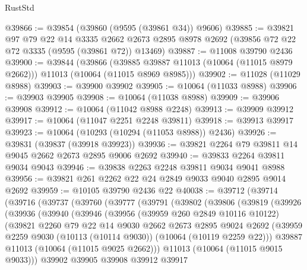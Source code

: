 \begin{lexlean}{RustStd}
\begin{coremodule}
@39866 := @39854 (@39860 (@9595 (@39861 @34)) @9606)
@39885 := @39821
    @97
    @79
    @22
    @14
    @3335
    @2662
    @2673
    @2895
    @8978
    @2692
    (@39856 @72 @22 @72 @3335 (@9595 (@39861 @72)) @13469)
@39887 := @11008 @39790 @2436
@39900 := @39844
    (@39866
      (@39885 @39887 @11013 (@10064 (@11015 @8979 @2662)))
      @11013
      (@10064 (@11015 @8969 @8985)))
@39902 := @11028 (@11029 @8988)
@39903 := @39900 @39902
@39905 := @10064 (@11033 @8988)
@39906 := @39903 @39905
@39908 := @10064 (@11038 @8988)
@39909 := @39906 @39908
@39912 := @10064 (@11042 @8988 @2248)
@39913 := @39909 @39912
@39917 := @10064 (@11047 @2251 @2248 @39811)
@39918 := @39913 @39917
@39923 := @10064 (@10293 (@10294 (@11053 @8988)) @2436)
@39926 := @39831 (@39837 (@39918 @39923))
@39936 := @39821 @2264 @79 @39811 @14 @9045 @2662 @2673 @2895 @9006 @2692
@39940 := @39833 @2264 @39811 @9034 @9043
@39946 := @39838 @2263 @2248 @39811 @9034 @9041 @8988
@39956 := @39821 @261 @2262 @22 @24 @2849 @9033 @9040 @2895 @9014 @2692
@39959 := @10105 @39790 @2436 @22
@40038 := @39712
    (@39714
      (@39716
        (@39737
          (@39760
            (@39777
              (@39791
                (@39802
                  (@39806
                    (@39819
                      (@39926
                        (@39936
                          (@39940
                            (@39946
                              (@39956
                                (@39959 @260 @2849 @10116 @10122)
                                (@39821
                                  @2260
                                  @79
                                  @22
                                  @14
                                  @9030
                                  @2662
                                  @2673
                                  @2895
                                  @9024
                                  @2692
                                  (@39959
                                    @2259
                                    @9030
                                    (@10113 (@10114 @9030))
                                    (@10064 (@10119 @2259 @22)))
                                  @39887
                                  @11013
                                  (@10064 (@11015 @9025 @2662)))
                                @11013
                                (@10064 (@11015 @9015 @9033)))
                              @39902
                              @39905
                              @39908
                              @39912
                              @39917

\end{coremodule}
\end{lexlean}
